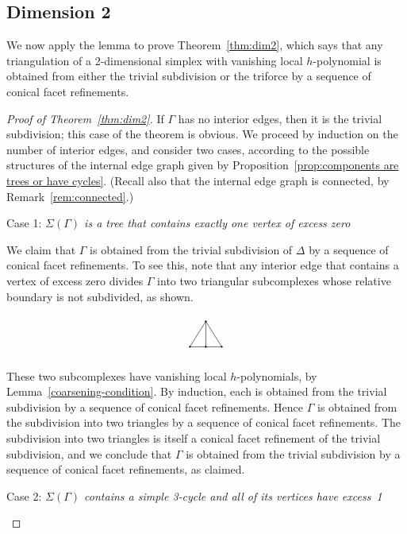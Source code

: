 \documentclass[ALCO,ThmDefs,Unicode,epreuves]{cedram}
\newenvironment{proofsection}[2]{\begin{enonce*}[remark]{#1 \emph{#2}} \ }{\end{enonce*}}
\begin{document}
\subsection{Dimension 2}
We now apply the lemma to prove Theorem~\ref{thm:dim2}, which says that any triangulation of a 2-dimensional simplex with vanishing local $h$-polynomial is obtained from either the trivial subdivision or the triforce by a sequence of conical facet refinements. 

\begin{proof}[Proof of Theorem~\ref{thm:dim2}]
If $\Gamma$ has no interior edges, then it is the trivial subdivision; this case of the theorem is obvious. We proceed by induction on the number of interior edges, and consider two cases, according to the possible structures of the internal edge graph given by Proposition~\ref{prop:components are trees or have cycles}. (Recall also that the internal edge graph is connected, by Remark~\ref{rem:connected}.)
 

\begin{proofsection}{Case 1:}{$\Sigma(\Gamma)$ is a tree that contains exactly one vertex of excess zero} 

We claim that $\Gamma$ is obtained from the trivial subdivision of $\Delta$ by a sequence of conical facet refinements. To see this, note that any interior edge that contains a vertex of excess zero divides $\Gamma$ into two triangular subcomplexes whose relative boundary is not subdivided, as shown.
\[
\begin{tikzpicture}
\filldraw (0,0) circle (.6pt) -- (.5,0) circle (.6pt)-- (1,0)circle (.6pt) -- (.5,.8)circle (.6pt) -- (0,0);
\filldraw (.5,0)circle (.6pt) -- (.5,.8) ;
\node at (.5,-.2) {};
\node at (.5, 1) {};
\end{tikzpicture}
\]
These two subcomplexes have vanishing local $h$-polynomials, by Lemma~\ref{coarsening-condition}. By induction, each is obtained from the trivial subdivision by a sequence of conical facet refinements. Hence $\Gamma$ is obtained from the subdivision into two triangles by a sequence of conical facet refinements. The subdivision into two triangles is itself a conical facet refinement of the trivial subdivision, and we conclude that $\Gamma$ is obtained from the trivial subdivision by a sequence of conical facet refinements, as claimed.
\end{proofsection}

\begin{proofsection}{Case 2:}{$\Sigma(\Gamma)$ contains a simple 3-cycle and all of its vertices have excess~1} 


\end{proofsection}
\end{proof}
\end{document}
